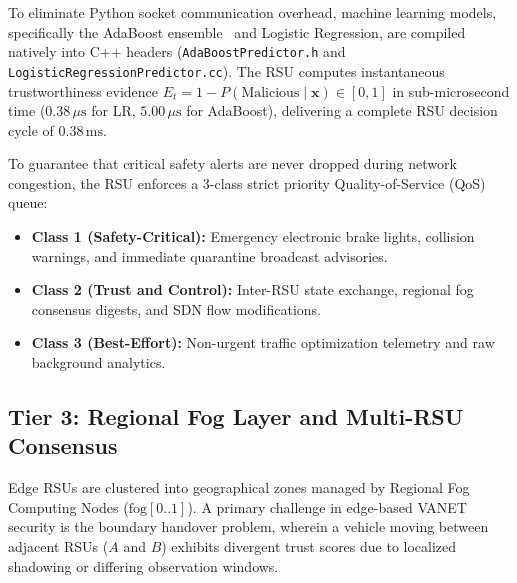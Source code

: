 \documentclass[conference]{IEEEtran}
\begin{document}
To eliminate Python socket communication overhead, machine learning models, specifically the AdaBoost ensemble~\cite{adaboost, dietterich2000ensemble} and Logistic Regression, are compiled natively into C++ headers (\texttt{AdaBoostPredictor.h} and \texttt{LogisticRegressionPredictor.cc}). The RSU computes instantaneous trustworthiness evidence $E_t = 1 - P(\text{Malicious} \mid \mathbf{x}) \in [0, 1]$ in sub-microsecond time ($0.38\,\mu\text{s}$ for LR, $5.00\,\mu\text{s}$ for AdaBoost), delivering a complete RSU decision cycle of $0.38\,\text{ms}$.

To guarantee that critical safety alerts are never dropped during network congestion, the RSU enforces a 3-class strict priority Quality-of-Service (QoS) queue:
\begin{itemize}
    \item \textbf{Class 1 (Safety-Critical):} Emergency electronic brake lights, collision warnings, and immediate quarantine broadcast advisories.
    \item \textbf{Class 2 (Trust and Control):} Inter-RSU state exchange, regional fog consensus digests, and SDN flow modifications.
    \item \textbf{Class 3 (Best-Effort):} Non-urgent traffic optimization telemetry and raw background analytics.
\end{itemize}

\subsection{Tier 3: Regional Fog Layer and Multi-RSU Consensus}

Edge RSUs are clustered into geographical zones managed by Regional Fog Computing Nodes ($\text{fog}[0..1]$). A primary challenge in edge-based VANET security is the boundary handover problem, wherein a vehicle moving between adjacent RSUs ($A$ and $B$) exhibits divergent trust scores due to localized shadowing or differing observation windows.
\end{document}
